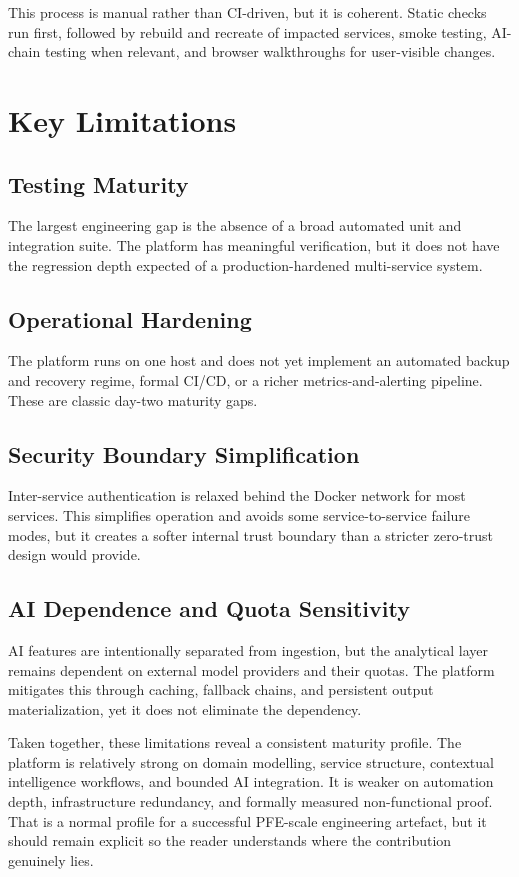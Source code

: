 This process is manual rather than CI-driven, but it is coherent. Static checks run first, followed by rebuild and recreate of impacted services, smoke testing, AI-chain testing when relevant, and browser walkthroughs for user-visible changes.

\section{Key Limitations}
\subsection{Testing Maturity}
The largest engineering gap is the absence of a broad automated unit and integration suite. The platform has meaningful verification, but it does not have the regression depth expected of a production-hardened multi-service system.

\subsection{Operational Hardening}
The platform runs on one host and does not yet implement an automated backup and recovery regime, formal CI/CD, or a richer metrics-and-alerting pipeline. These are classic day-two maturity gaps.

\subsection{Security Boundary Simplification}
Inter-service authentication is relaxed behind the Docker network for most services. This simplifies operation and avoids some service-to-service failure modes, but it creates a softer internal trust boundary than a stricter zero-trust design would provide.

\subsection{AI Dependence and Quota Sensitivity}
AI features are intentionally separated from ingestion, but the analytical layer remains dependent on external model providers and their quotas. The platform mitigates this through caching, fallback chains, and persistent output materialization, yet it does not eliminate the dependency.

Taken together, these limitations reveal a consistent maturity profile. The platform is relatively strong on domain modelling, service structure, contextual intelligence workflows, and bounded AI integration. It is weaker on automation depth, infrastructure redundancy, and formally measured non-functional proof. That is a normal profile for a successful PFE-scale engineering artefact, but it should remain explicit so the reader understands where the contribution genuinely lies.

